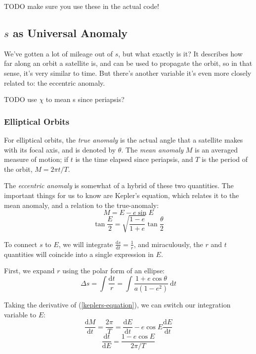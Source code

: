 \documentclass{article}
\newcommand{\dd}{\mathrm{d}}
\newcommand{\der}[2]{\frac{\dd #1}{\dd #2}}
\numberwithin{equation}{subsection}
\begin{document}
TODO make sure you use these in the actual code!


\subsection{\texorpdfstring{$s$}{s} as Universal Anomaly}

We've gotten a lot of mileage out of $s$, but what exactly is it? It describes how far along an orbit a satellite is, and can be used to propagate the orbit, so in that sense, it's very similar to time. But there's another variable it's even more closely related to: the eccentric anomaly.

TODO use $\chi$ to mean s since periapsis?

\subsubsection*{Elliptical Orbits}

For elliptical orbits, the \emph{true anomaly} is the actual angle that a satellite makes with its focal axis, and is denoted by $\theta$. The \emph{mean anomaly} $M$ is an averaged measure of motion; if $t$ is the time elapsed since periapsis, and $T$ is the period of the orbit, $M = 2 \pi t / T$.

The \emph{eccentric anomaly} is somewhat of a hybrid of these two quantities. The important things for us to know are Kepler's equation, which relates it to the mean anomaly, and a relation to the true-anomaly:
\begin{equation}
\label{keplers-equation}
M = E - e \sin E
\end{equation}
\begin{equation}
\label{eccentric-anomaly}
\tan{\frac{E}{2}} = \sqrt{\frac{1-e}{1+e}} \tan{\frac{\theta}{2}}
\end{equation}

To connect $s$ to $E$, we will integrate $\der{s}{t} = \frac{1}{r}$, and miraculously, the $r$ and $t$ quantities will coincide into a single expression in $E$.

First, we expand $r$ using the polar form of an ellipse:
\begin{equation}
\label{integrate-ellipse}
\Delta s = \int \frac{\dd t}{r} = \int \frac{1 + e \cos \theta}{a (1-e^2)}~\dd t
\end{equation}

Taking the derivative of (\ref{keplers-equation}), we can switch our integration variable to $E$:
\begin{equation*}
\der{M}{t} = \frac{2 \pi}{T} = \der{E}{t} - e \cos E \der{E}{t}
\end{equation*}
\begin{equation}
\der{t}{E} = \frac{1 - e \cos E}{2 \pi / T}
\end{equation}
\end{document}
